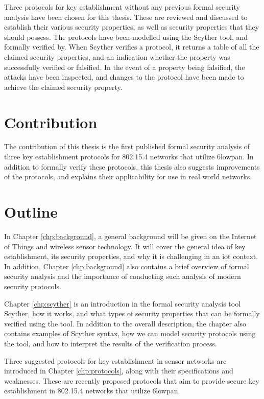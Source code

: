 Three protocols for key establishment without any previous formal security analysis have been chosen for this thesis. These are reviewed and discussed to establish their various security properties, as well as security properties that they should possess. The protocols have been modelled using the Scyther tool, and formally verified by. When Scyther verifies a protocol, it returns a table of all the claimed security properties, and an indication whether the property was successfully verified or falsified. In the event of a property being falsified, the attacks have been inspected, and changes to the protocol have been made to achieve the claimed security property. 

\section{Contribution}

The contribution of this thesis is the first published formal security analysis of three key establishment protocols for 802.15.4 networks that utilize \gls{6lowpan}. In addition to formally verify these protocols, this thesis also suggests improvements of the protocols, and explains their applicability for use in real world networks.


\section{Outline}

In Chapter \ref{chp:background}, a general background will be given on the Internet of Things and wireless sensor technology. It will cover the general idea of key establishment, its security properties, and why it is challenging in an \gls{iot} context. In addition, Chapter \ref{chp:background} also contains a brief overview of formal security analysis and the importance of conducting such analysis of modern security protocols.

Chapter \ref{chp:scyther} is an introduction in the formal security analysis tool Scyther, how it works, and what types of security properties that can be formally verified using the tool. In addition to the overall description, the chapter also contains examples of Scyther syntax, how we can model security protocols using the tool, and how to interpret the results of the verification process.

Three suggested protocols for key establishment in sensor networks are introduced in Chapter \ref{chp:protocols}, along with their specifications and weaknesses. These are recently proposed protocols that aim to provide secure key establishment in 802.15.4 networks that utilize \gls{6lowpan}.

